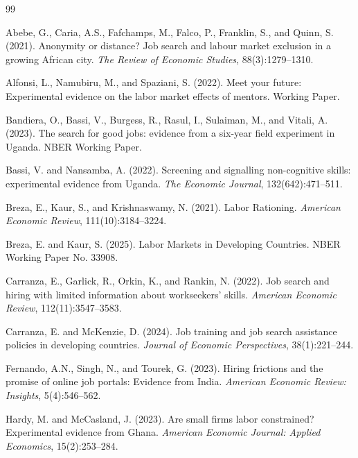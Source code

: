 \documentclass[12pt]{article}
\begin{document}

\begin{thebibliography}{99}

Abebe, G., Caria, A.S., Fafchamps, M., Falco, P., Franklin, S., and Quinn, S. (2021).
Anonymity or distance? Job search and labour market exclusion in a growing African city.
\textit{The Review of Economic Studies}, 88(3):1279--1310.

Alfonsi, L., Namubiru, M., and Spaziani, S. (2022).
Meet your future: Experimental evidence on the labor market effects of mentors.
Working Paper.

Bandiera, O., Bassi, V., Burgess, R., Rasul, I., Sulaiman, M., and Vitali, A. (2023).
The search for good jobs: evidence from a six-year field experiment in Uganda.
NBER Working Paper.

Bassi, V. and Nansamba, A. (2022).
Screening and signalling non-cognitive skills: experimental evidence from Uganda.
\textit{The Economic Journal}, 132(642):471--511.

Breza, E., Kaur, S., and Krishnaswamy, N. (2021).
Labor Rationing.
\textit{American Economic Review}, 111(10):3184--3224.

Breza, E. and Kaur, S. (2025).
Labor Markets in Developing Countries.
NBER Working Paper No. 33908.

Carranza, E., Garlick, R., Orkin, K., and Rankin, N. (2022).
Job search and hiring with limited information about workseekers' skills.
\textit{American Economic Review}, 112(11):3547--3583.

Carranza, E. and McKenzie, D. (2024).
Job training and job search assistance policies in developing countries.
\textit{Journal of Economic Perspectives}, 38(1):221--244.

Fernando, A.N., Singh, N., and Tourek, G. (2023).
Hiring frictions and the promise of online job portals: Evidence from India.
\textit{American Economic Review: Insights}, 5(4):546--562.

Hardy, M. and McCasland, J. (2023).
Are small firms labor constrained? Experimental evidence from Ghana.
\textit{American Economic Journal: Applied Economics}, 15(2):253--284.


\end{thebibliography}
\end{document}
